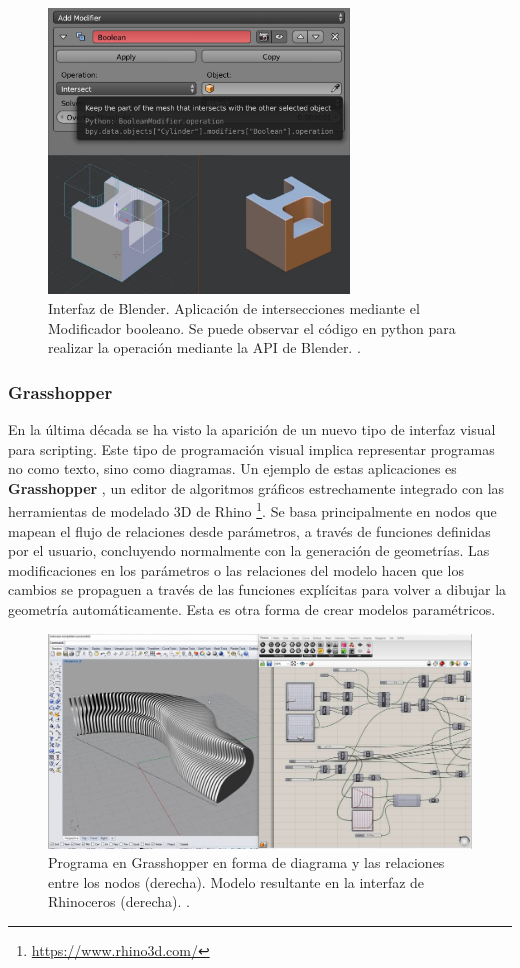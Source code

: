 \begin{figure}[h]
\includegraphics[width=8cm]{Img/Modelos/modelado22.jpg}
\centering
\caption{\footnotesize{Interfaz de Blender. Aplicación de intersecciones mediante el Modificador booleano. Se puede observar el código en python para realizar la operación mediante la API de Blender.  \citep{blenderBoolean}. }}
\end{figure}


\subsubsection{Grasshopper} 
En la última década se ha visto la aparición de un nuevo tipo de interfaz visual para scripting. Este tipo de programación visual implica representar programas no como texto, sino como diagramas. Un ejemplo de estas aplicaciones es \textbf{Grasshopper}  \citep{BobMcNeel}, un editor de algoritmos gráficos estrechamente integrado con las herramientas de modelado 3D de Rhino \footnote{\url{https://www.rhino3d.com/}}. Se basa principalmente en nodos que mapean el flujo de relaciones desde parámetros, a través de funciones definidas por el usuario, concluyendo normalmente con la generación de geometrías. Las modificaciones en los parámetros o las relaciones del modelo hacen que los cambios se propaguen a través de las funciones explícitas para volver a dibujar la geometría automáticamente. Esta es otra forma de crear modelos paramétricos.

\begin{figure}[h]
\includegraphics[width=14cm]{Img/CPD/cpd-grass.jpg}
\centering
\caption{\footnotesize{Programa en Grasshopper en forma de diagrama y las relaciones entre los nodos (derecha). Modelo resultante en la interfaz de Rhinoceros (derecha).  \citep{DanielParametric}.}}
\end{figure}


